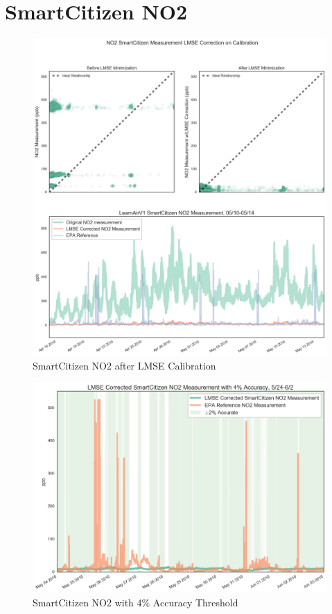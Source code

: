 \FloatBarrier
\section{SmartCitizen NO2}
\FloatBarrier

\begin{figure}[htb]
 	\includegraphics[width=\textwidth]{figs/sck_no2_lmse}               
 	 \caption{SmartCitizen NO2 after LMSE Calibration}
  	\label{fig:sck_no2_lmse}
\end{figure}

\begin{figure}[htb]
 	\includegraphics[width=\textwidth]{figs/sck_no2_with_4_accuracy_zoomed}               
 	 \caption{SmartCitizen NO2 with 4\% Accuracy Threshold}
  	\label{fig:sck_no2_with_4_accuracy_zoomed}
\end{figure}

